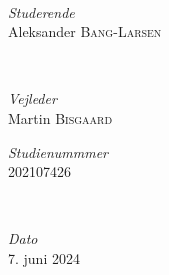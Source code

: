 	\HRule\\[1.5cm]


	\begin{minipage}{0.4\textwidth}
		\begin{flushleft}
			\large
			\textit{Studerende}\\
			Aleksander \textsc{Bang-Larsen}\\ %
		\end{flushleft}
	\end{minipage}
	~
	\begin{minipage}{0.4\textwidth}
		\begin{flushright}
			\large
			\textit{Vejleder}\\
			Martin \textsc{Bisgaard} %
		\end{flushright}
	\end{minipage}


	\begin{minipage}{0.4\textwidth}
		\begin{flushleft}
			\large
			\textit{Studienummmer}\\
			202107426\\
		\end{flushleft}
	\end{minipage}
	~
	\begin{minipage}{0.4\textwidth}
		\begin{flushright}
			\large
			\textit{Dato}\\
			7. juni 2024
		\end{flushright}
	\end{minipage}



